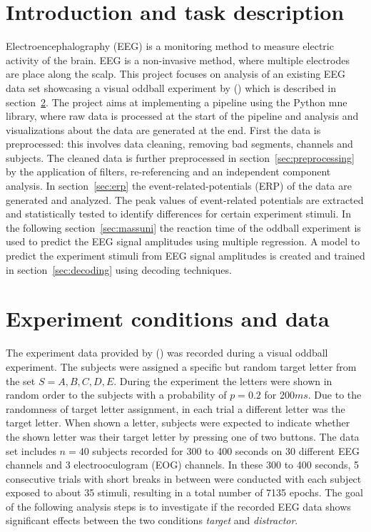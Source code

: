 \documentclass[a4paper]{article}
\newcommand{\caay}[2][]{
\citeauthor{#2} (\citeyear[#1]{#2})\xspace
}
\begin{document}
\newpage
{}

\FloatBarrier
\section{Introduction and task description}
\label{sec:intro}
Electroencephalography (EEG) is a monitoring method to measure electric activity of the brain.
EEG is a non-invasive method, where multiple electrodes are place along the scalp.
This project focuses on analysis of an existing EEG data set showcasing a visual oddball experiment by\caay{Kappenman2021} which is described in section~\ref{sec:experiment}.
The project aims at implementing a pipeline using the Python mne library, where raw data is processed at the start of the pipeline and analysis and visualizations about the data are generated at the end.
First the data is preprocessed: this involves data cleaning, removing bad segments, channels and subjects.
The cleaned data is further preprocessed in section~\ref{sec:preprocessing} by the application of filters, re-referencing and an independent component analysis.
In section~\ref{sec:erp} the event-related-potentials (ERP) of the data are generated and analyzed.
The peak values of event-related potentials are extracted and statistically tested to identify differences for certain experiment stimuli.
In the following section~\ref{sec:massuni} the reaction time of the oddball experiment is used to predict the EEG signal amplitudes using multiple regression.
A model to predict the experiment stimuli from EEG signal amplitudes is created and trained in section~\ref{sec:decoding} using decoding techniques.

\section{Experiment conditions and data}
\label{sec:experiment}
The experiment data provided by \caay{Kappenman2021} was recorded during a visual oddball experiment.
The subjects were assigned a specific but random target letter from the set $S = {A,B,C,D,E}$.
During the experiment the letters were shown in random order to the subjects with a probability of $p=0.2$ for 200$ms$.
Due to the randomness of target letter assignment, in each trial a different letter was the target letter.
When shown a letter, subjects were expected to indicate whether the shown letter was their target letter by pressing one of two buttons.
The data set includes $n=40$ subjects recorded for 300 to 400 seconds on 30 different EEG channels and 3 electrooculogram (EOG) channels.
In these 300 to 400 seconds, 5 consecutive trials with short breaks in between were conducted with each subject exposed to about 35 stimuli, resulting in a total number of 7135 epochs. 
The goal of the following analysis steps is to investigate if the recorded EEG data shows significant effects between the two conditions \textit{target} and \textit{distractor}.
\end{document}
